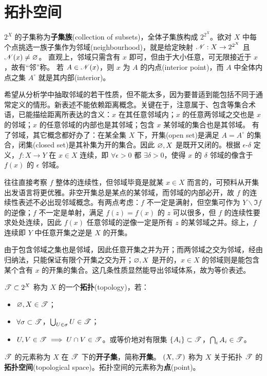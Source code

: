\section{拓扑空间}

$2^X$ 的子集称为\textbf{子集族}(collection of subsets)，全体子集族构成 $2^{2^X}$。欲对 $X$ 中每个点挑选⼀族⼦集作为邻域(neighbourhood)，就是给定映射 $\mathscr N:X\to 2^{2^X}$ 且 $\mathscr N(x)\ne \varnothing$。
直观上，邻域只需含有 $x$ 即可，但由于大小任意，可无限接近于 $x$，故有“邻”称。
若 $A\in \mathscr N(x)$，则 $x$ 为 $A$ 的内点(interior point)，而 $A$ 中全体内点之集 $A^\circ$ 就是其内部(interior)。

希望从分析学中抽取邻域的若干性质，但不能太多，因为要普适到能包括不同于通常定义的情形。新表述不能依赖距离概念。关键在于，注意属于、包含等集合术语，已能描绘距离所表达的含义：$x$ 在其任意邻域内；$x$ 的任意两邻域之交也是 $x$ 的邻域；$x$ 的任意邻域的内部也是其邻域；包含 $x$ 某邻域的集合也是其邻域。
有了邻域，其它概念都好办了：在某全集 $X$ 下，开集(open set)是满足 $A=A^\circ$ 的集合，闭集(closed set)是其补集为开的集合。因此 $\varnothing,X$ 是既开又闭的。根据 $\epsilon$-$\delta$ 定义，$f:X\to Y$ 在 $x\in X$ 连续，即 $\forall\epsilon>0$ 都 $\exists\delta>0$，使得 $x$ 的 $\delta$ 邻域的像含于 $f(x)$ 的 $\epsilon$ 邻域。

往往直接考察 $f$ 整体的连续性，但邻域毕竟是就某 $x\in X$ 而言的，可预料从开集出发语言将更优雅。非空开集总是某点的某邻域，而邻域的内部必开，故 $f$ 的连续性表述不必出现邻域概念。有两点考虑：$f$ 不一定是满射，但空集可作为 $Y\backslash\Im f$ 的逆像；$f$ 不一定是单射，满足 $f(z)=f(x)$ 的 $z$ 可以很多，但 $f$ 的连续性要求处处连续，因此 $f(x)$ 任意邻域的逆像一定是所有 $z$ 的某邻域之并。综上，$f$ 连续即 $Y$ 中任意开集之逆是 $X$ 的开集。

由于包含邻域之集也是邻域，因此任意开集之并为开；而两邻域之交为邻域，经由归纳法，只能保证有限个开集之交为开；$\varnothing,X$ 是开的，$x\in X$ 的邻域则是能包含某个含有 $x$ 的开集的集合。这几条性质显然能导出邻域体系，故为等价表述。

\begin{definition}\label{def:topology}
$\mathscr{T}\subset 2^X$ 称为 $X$ 的一个\textbf{拓扑}(topology)，若：
\begin{itemize}
    \item $\varnothing,X \in \mathscr{T}$；
    \item $\forall \sigma\subset \mathscr{T}$，$\bigcup_{U\in\sigma} U\in \mathscr{T}$；
    \item $U,V\in\mathscr{T}\implies U\cap V\in\mathscr{T}$。或等价地对有限集 $\{A_{i}\} \subset \mathscr{T}$，$\bigcap_{i} A_{i} \in \mathscr{T}$。
\end{itemize}
$\mathscr{T}$ 的元素称为 $X$ 在 $\mathscr{T}$ 下的\textbf{开子集}，简称\textbf{开集}。
$(X,\mathscr T)$ 称为 $X$ 关于拓扑 $\mathscr T$ 的\textbf{拓扑空间}(topological space)。拓扑空间的元素称为\textbf{点}(point)。
\end{definition}

